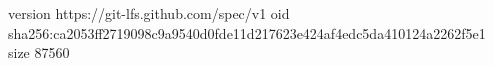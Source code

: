 version https://git-lfs.github.com/spec/v1
oid sha256:ca2053ff2719098c9a9540d0fde11d217623e424af4edc5da410124a2262f5e1
size 87560
